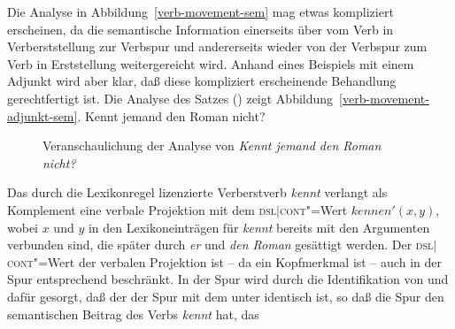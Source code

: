 Die Analyse in Abbildung~\ref{verb-movement-sem} mag etwas kompliziert erscheinen, da die semantische
Information einerseits über \dsl vom Verb in Verberststellung zur Verbspur und andererseits wieder von
der Verbspur zum Verb in Erststellung weitergereicht wird. Anhand eines Beispiels mit einem Adjunkt
wird aber klar, daß diese kompliziert erscheinende Behandlung gerechtfertigt ist. Die Analyse des
Satzes () zeigt Abbildung~\vref{verb-movement-adjunkt-sem}.
\ea
Kennt jemand den Roman nicht?
\z
\begin{figure}
\caption{\label{verb-movement-adjunkt-sem}Veranschaulichung der Analyse von \emph{Kennt jemand den Roman nicht?}}
\end{figure}
Das durch die Lexikonregel lizenzierte Verberstverb \emph{kennt} verlangt als Komplement eine
verbale Projektion mit dem \textsc{dsl$|$cont}"=Wert $kennen'(x, y)$, wobei $x$ und $y$ in den
Lexikoneinträgen für \emph{kennt} bereits mit den Argumenten verbunden sind, die später durch
\emph{er} und \emph{den Roman} gesättigt werden. Der \textsc{dsl$|$cont}"=Wert der verbalen Projektion
ist -- da \dsl ein Kopfmerkmal ist -- auch in der Spur entsprechend beschränkt. In der Spur wird
durch die Identifikation von \dsl und \local dafür gesorgt, daß der \contw der Spur mit dem \contw
unter \dsl identisch ist, so daß die Spur den semantischen Beitrag des Verbs \emph{kennt} hat, das
